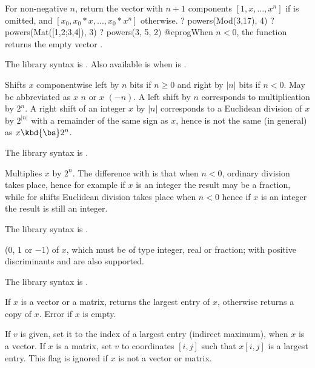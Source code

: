 \label{se:powers}
For non-negative $n$, return the vector with $n+1$ components
$[1,x,\dots,x^n]$ if  is omitted, and $[x_0, x_0*x, ..., x_0*x^n]$
otherwise.
\bprog
? powers(Mod(3,17), 4)
? powers(Mat([1,2;3,4]), 3)
? powers(3, 5, 2)
@eprog\noindent When $n < 0$, the function returns the empty vector \kbd{[]}.

The library syntax is .
Also available is
 when  is .

\label{se:shift}
Shifts $x$ componentwise left by $n$ bits if $n\ge0$ and right by $|n|$
bits if $n<0$. May be abbreviated as $x$ \kbd{<<} $n$ or $x$ \kbd{>>} $(-n)$.
A left shift by $n$ corresponds to multiplication by $2^n$. A right shift of an
integer $x$ by $|n|$ corresponds to a Euclidean division of $x$ by $2^{|n|}$
with a remainder of the same sign as $x$, hence is not the same (in general) as
$x \kbd{\bs} 2^n$.

The library syntax is .

\label{se:shiftmul}
Multiplies $x$ by $2^n$. The difference with
 is that when $n<0$, ordinary division takes place, hence for
example if $x$ is an integer the result may be a fraction, while for shifts
Euclidean division takes place when $n<0$ hence if $x$ is an integer the result
is still an integer.

The library syntax is .

\label{se:sign}
 ($0$, $1$ or $-1$) of $x$, which must be of
type integer, real or fraction;  with positive discriminants and
 are also supported.

The library syntax is .

\label{se:vecmax}
If $x$ is a vector or a matrix, returns the largest entry of $x$,
otherwise returns a copy of $x$. Error if $x$ is empty.

If $v$ is given, set it to the index of a largest entry (indirect maximum),
when $x$ is a vector. If $x$ is a matrix, set $v$ to coordinates $[i,j]$
such that $x[i,j]$ is a largest entry. This flag is ignored if $x$ is not a
vector or matrix.

